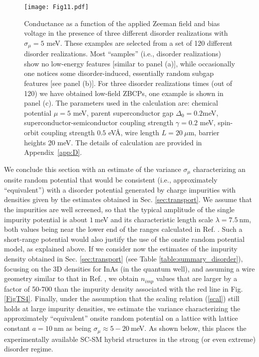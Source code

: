 \documentclass[aps,prmaterials,twocolumn,superscriptaddress,longbibliography]{revtex4-2}
\begin{document}
\begin{figure*}[t]
    \centering
    \texttt{[image: Fig11.pdf]}
    \caption{Conductance as a function of the applied  Zeeman field and bias voltage in the presence of three different disorder realizations with $\sigma_\mu=5$ meV. These examples are selected from a set of 120 different disorder realizations. Most ``samples'' (i.e., disorder realizations) show no low-energy features [similar to panel (a)], while occasionally one notices some disorder-induced, essentially random subgap features [see panel (b)].  For three disorder realizations times (out of 120) we have obtained low-field  ZBCPs, one example is shown in panel (c). 
    The  parameters used in the calculation are: chemical potential $\mu=5$ meV, parent superconductor gap $\Delta_0=0.2 $meV, superconductor-semiconductor coupling strength $\gamma=0.2$ meV, spin-orbit coupling strength $0.5$ eV\AA, wire length $L=20~\mu$m, barrier heights 20 meV. The details of calculation are provided in Appendix~\ref{app:D}.}
    \label{fig:11_muVar5}
\end{figure*}

We conclude this section with an estimate of the variance $\sigma_\mu$ characterizing an onsite random potential that would be consistent (i.e., approximately ``equivalent'') with a disorder potential generated by charge impurities with densities given by the estimates obtained in Sec. \ref{sec:transport}. We assume that the impurities are well screened, so that the typical amplitude of the single impurity potential is about $1~$meV and its characteristic length scale $\lambda = 7.5~$nm, both values being near the lower end of the ranges calculated in Ref. . Such a short-range potential would also justify the use of the onsite random potential model, as explained above. If we consider now the estimates of the impurity density obtained in  Sec. \ref{sec:transport} (see Table \ref{table:summary_disorder}), focusing on the 3D densities for InAs (in the quantum well), and assuming a wire geometry similar to that in Ref. , we obtain $n_{imp}$ values that are larger by a factor of 50-700 than the impurity density associated with the red line in Fig. \ref{FigTS4}. Finally, under the assumption that the scaling relation (\ref{scal}) still holds at large impurity densities, we estimate the variance characterizing the approximately ``equivalent'' onsite random potential on a lattice with lattice constant $a=10~$nm as being $\sigma_\mu \approx 5-20~$meV. As shown below, this places the experimentally available SC-SM hybrid structures in the strong (or even extreme) disorder regime.
\end{document}

